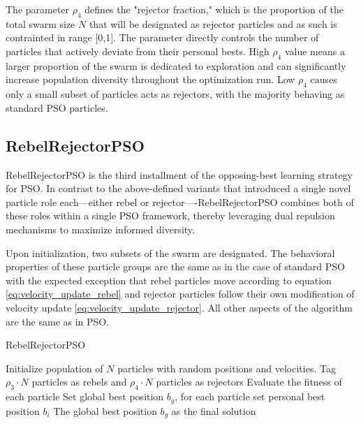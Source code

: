 {The parameter $\rho_4$ defines the "rejector fraction," which is the proportion of the total swarm size $N$ that will be designated as rejector particles and as such is contrainted in range [0,1]. The parameter directly controls the number of particles that actively deviate from their personal bests. High $\rho_4$ value means a larger proportion of the swarm is dedicated to exploration and can significantly increase population diversity throughout the optimization run. Low $\rho_4$ causes only a small subset of particles acts as rejectors, with the majority behaving as standard PSO particles.

\subsection{RebelRejectorPSO}

RebelRejectorPSO is the third installment of the opposing-best learning strategy for PSO. 
In contrast to the above-defined variants that introduced a single novel particle role each---either rebel or rejector----RebelRejectorPSO combines both of these roles within a single PSO framework, thereby leveraging dual repulsion mechanisms to maximize informed diversity. 

Upon initialization, two subsets of the swarm are designated.
The behavioral properties of these particle groups are the same as in the case of standard PSO with the expected exception that rebel particles move according to equation \eqref{eq:velocity_update_rebel} and rejector particles follow their own modification of velocity update \eqref{eq:velocity_update_rejector}. All other aspects of the algorithm are the same as in PSO.

\vspace{.935em}
\begin{algorithm}[H]
\caption{RebelRejectorPSO}\label{alg:rebel_rejector}
Initialize population of \(N\) particles with random positions and velocities. Tag \(\rho_3 \cdot N\) particles as rebels and  \(\rho_4 \cdot N\) particles as rejectors\;
Evaluate the fitness of each particle\;
Set global best position \(b_g\), for each particle set personal best position \(b_i\)\;
\Return The global best position \(b_g\) as the final solution\;
\end{algorithm}
\vspace{.935em}


}
